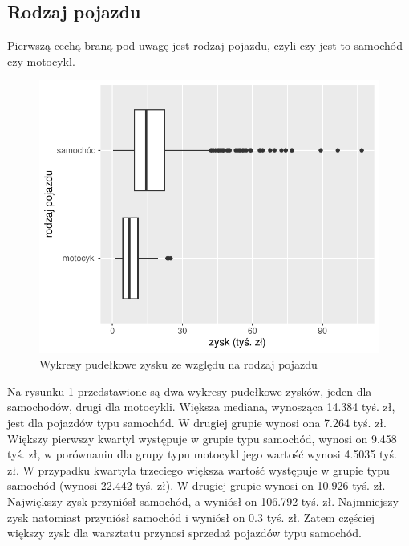 \documentclass{article}\usepackage[]{graphicx}\usepackage[]{xcolor}
\makeatletter
\def\maxwidth{ %
  \ifdim\Gin@nat@width>\linewidth
    \linewidth
  \else
    \Gin@nat@width
  \fi
}
\newenvironment{knitrout}{}{} %
\makeatother
\begin{document}
\subsection{Rodzaj pojazdu}

Pierwszą cechą braną pod uwagę jest rodzaj pojazdu, czyli czy jest to samochód czy motocykl.

\begin{knitrout}
\color{fgcolor}\begin{figure}[H]

{\centering \includegraphics[width=\maxwidth]{figure/fig_typ-1} 

}

\caption[Wykresy pudełkowe zysku ze względu na rodzaj pojazdu]{Wykresy pudełkowe zysku ze względu na rodzaj pojazdu}\label{fig:fig_typ}
\end{figure}

\end{knitrout}

Na rysunku \ref{fig:fig_typ} przedstawione są dwa wykresy pudełkowe zysków, jeden dla samochodów, drugi dla motocykli. Większa mediana, wynosząca 14.384 tyś. zł, jest dla pojazdów typu samochód. W drugiej grupie wynosi ona 7.264 tyś. zł. 
Większy pierwszy kwartyl występuje w grupie typu samochód, wynosi on 9.458 tyś. zł, w porównaniu dla grupy typu motocykl jego wartość wynosi 4.5035 tyś. zł.
W przypadku kwartyla trzeciego większa wartość występuje w grupie typu samochód (wynosi 22.442 tyś. zł). W drugiej grupie wynosi on 10.926 tyś. zł.
Największy zysk przyniósł samochód, a wyniósł on 106.792 tyś. zł. 
Najmniejszy zysk natomiast przyniósł samochód i wyniósł on 0.3 tyś. zł. Zatem częściej większy zysk dla warsztatu przynosi sprzedaż pojazdów typu samochód. 
\end{document}
